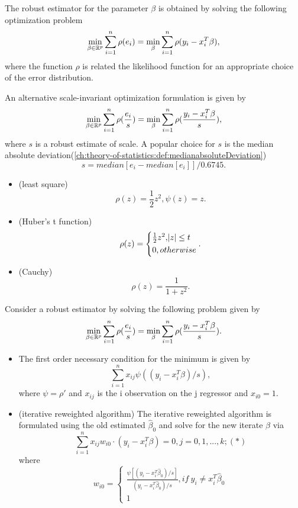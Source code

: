 \begin{refsection}
\begin{lemma}
The robust estimator for the parameter $\beta$ is obtained by solving the following optimization problem	
$$\min_{\beta \in \mathbb{R}^p} \sum_{i=1}^{n} \rho(e_i) = \min_{\beta} \sum_{i=1}^{n} \rho(y_i - x_i^T\beta),$$
where the function $\rho$ is related the likelihood function for an appropriate choice of the error distribution.

An alternative scale-invariant optimization formulation is given by
$$\min_{\beta \in \mathbb{R}^p} \sum_{i=1}^{n} \rho(\frac{e_i}{s}) = \min_{\beta} \sum_{i=1}^{n} \rho(\frac{y_i - x_i^T\beta}{s}),$$
where $s$ is a robust estimate of scale. A popular choice for $s$ is the median absolute deviation(\autoref{ch:theory-of-statistics:def:medianabsoluteDeviation})
$$s = median[e_i - median[e_i]]/0.6745.$$	
\end{lemma}


\begin{example}\hfill
	\begin{itemize}
		\item (least square) $$\rho(z) = \frac{1}{2}z^2, \psi(z) = z.$$
		\item (Huber's t function)
		$$\rho(z) = 
		\begin{cases*}
		\frac{1}{2}z^2, \abs{z} \leq t \\
		0, otherwise
		\end{cases*}.$$
		\item (Cauchy)
		$$\rho(z) = \frac{1}{1+z^2}.$$ 
	\end{itemize}
\end{example}



\begin{lemma}\cite[373]{montgomery2012introduction}
Consider a robust estimator by solving the following problem given by
$$\min_{\beta \in \mathbb{R}^p} \sum_{i=1}^{n} \rho(\frac{e_i}{s}) = \min_{\beta} \sum_{i=1}^{n} \rho(\frac{y_i - x_i^T\beta}{s}).$$
\begin{itemize}
	\item The first order necessary condition for the minimum is given by
	$$\sum_{i=1}^{n} x_{ij}\psi((y_i-x_i^T\beta)/s),$$
where $\psi = \rho'$ and $x_{ij}$ is the i observation on the j regressor and $x_{i0}=1$.	
\item (iterative reweighted algorithm) The iterative reweighted algorithm is formulated using the old estimated $\hat{\beta}_0$ and solve for the new iterate $\beta$ via
	$$\sum_{i=1}^{n} x_{ij}w_{i0}\cdot (y_i-x_i^T\beta) = 0, j=0,1,...,k; (*)$$
where 
$$w_{i0} = \begin{cases*}
\frac{\psi[(y_i-x_i^T\hat{\beta}_0)/s]}{(y_i-x_i^T\hat{\beta}_0)/s}, if~y_i\neq x_i^T\hat{\beta}_0 \\
1
\end{cases*}$$	


\end{itemize}
\end{lemma}
\end{refsection}
